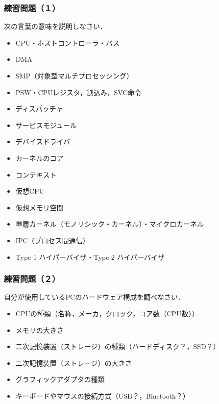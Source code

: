 \documentclass[handout]{beamer}                   %
\begin{document}
\begin{frame}
  \frametitle{練習問題（１）}
  次の言葉の意味を説明しなさい．
  \begin{itemize}
  \item CPU・ホストコントローラ・バス
  \item DMA
  \item SMP（対象型マルチプロセッシング）
  \item PSW・CPUレジスタ，割込み，SVC命令
  \item ディスパッチャ
  \item サービスモジュール
  \item デバイスドライバ
  \item カーネルのコア
  \item コンテキスト
  \item 仮想CPU
  \item 仮想メモリ空間
  \item 単層カーネル（モノリシック・カーネル）・マイクロカーネル
  \item IPC（プロセス間通信）
  \item Type 1 ハイパーバイザ・Type 2 ハイパーバイザ
  \end{itemize}
  \vfill
\end{frame}

\begin{frame}
  \frametitle{練習問題（２）}
  自分が使用しているPCのハードウェア構成を調べなさい．
  \begin{itemize}
  \item CPUの種類（名称，メーカ，クロック，コア数（CPU数））
  \item メモリの大きさ
  \item 二次記憶装置（ストレージ）の種類（ハードディスク？，SSD？）
  \item 二次記憶装置（ストレージ）の大きさ
  \item グラフィックアダプタの種類
  \item キーボードやマウスの接続方式（USB？，Bluetooth？）
  \end{itemize}
  \vfill
\end{frame}
\end{document}
